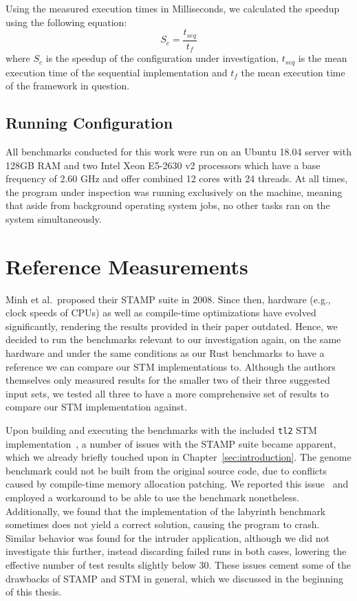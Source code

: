 Using the measured execution times in Milliseconds, we calculated the speedup using the following equation:
\[
    S_c = \frac{t_{seq}}{t_f}
\]
where $S_c$ is the speedup of the configuration under investigation, $t_{seq}$ is the mean execution time of the sequential implementation and $t_f$ the mean execution time of the framework in question.

\subsection{Running Configuration}
\label{sec:experiments:measurements:hardware}

All benchmarks conducted for this work were run on an Ubuntu 18.04 server with 128GB RAM and two Intel Xeon E5-2630 v2 processors which have a base frequency of 2.60 GHz and offer combined 12 cores with 24 threads.
At all times, the program under inspection was running exclusively on the machine, meaning that aside from background operating system jobs, no other tasks ran on the system simultaneously.

\section{Reference Measurements}
\label{sec:experiments:reference}

Minh et al.\ proposed their STAMP suite in 2008.
Since then, hardware (e.g., clock speeds of CPUs) as well as compile-time optimizations have evolved significantly, rendering the results provided in their paper outdated.
Hence, we decided to run the benchmarks relevant to our investigation again, on the same hardware and under the same conditions as our Rust benchmarks to have a reference we can compare our STM implementations to.
Although the authors themselves only measured results for the smaller two of their three suggested input sets, we tested all three to have a more comprehensive set of results to compare our STM implementation against.

Upon building and executing the benchmarks with the included \texttt{tl2} STM implementation~\cite{minh2013stampcode}, a number of issues with the STAMP suite became apparent, which we already briefly touched upon in Chapter~\ref{sec:introduction}.
The genome benchmark could not be built from the original source code, due to conflicts caused by compile-time memory allocation patching.
We reported this issue~\cite{wittwer2020stampgenome} and employed a workaround to be able to use the benchmark nonetheless.
Additionally, we found that the implementation of the labyrinth benchmark sometimes does not yield a correct solution, causing the program to crash.
Similar behavior was found for the intruder application, although we did not investigate this further, instead discarding failed runs in both cases, lowering the effective number of test results slightly below 30.
These issues cement some of the drawbacks of STAMP and STM in general, which we discussed in the beginning of this thesis.

